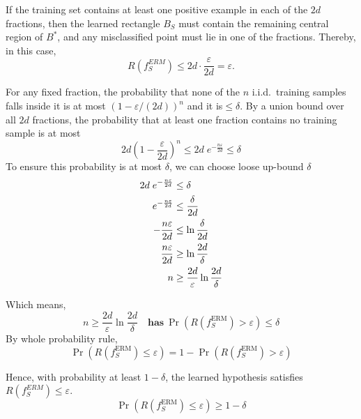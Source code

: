 \medskip
If the training set contains at least one positive example in each of the $2d$ fractions, then the learned rectangle $B_S$ must contain the remaining central region of $B^*$, and any misclassified point must lie in one of the fractions.
Thereby, in this case,
\[
R(f_S^{ERM}) \le 2d \cdot \frac{\varepsilon}{2d} = \varepsilon.
\]

For any fixed fraction, the probability that none of the $n$ i.i.d.\ training samples
falls inside it is at most $(1-\varepsilon/(2d))^n$ and it is$\le\delta$.
By a union bound over all $2d$ fractions, the probability that at least one fraction
contains no training sample is at most
\[
2d \left(1-\frac{\varepsilon}{2d}\right)^n  \le
2d \; e^{-\frac{n\varepsilon}{2d}} \le
\delta
\]
To ensure this probability is at most $\delta$, we can choose loose up-bound $\delta$
\begin{align*}
2d \; e^{-\frac{n\varepsilon}{2d}} &\le \delta \\
e^{-\frac{n\varepsilon}{2d}} &\le {\delta \over{2d}} \\
-\frac{n\varepsilon}{2d} &\le \ln{{\delta \over{2d}}}\\
\frac{n\varepsilon}{2d} &\ge  \ln{{2d \over{\delta}}}\\
n &\ge \frac{2d}{\varepsilon}\ln\frac{2d}{\delta}
\end{align*}

Which means,
\[
n \ge \frac{2d}{\varepsilon}\ln\frac{2d}{\delta} \quad  \textbf{has} \: \Pr(R(f_S^{\mathrm{ERM}}) > \varepsilon) \le \delta
\]
By whole probability rule,
\[
\Pr(R(f_S^{\mathrm{ERM}}) \le \varepsilon) = 1 - \Pr(R(f_S^{\mathrm{ERM}}) > \varepsilon)
\]

Hence, with probability at least $1-\delta$, the learned hypothesis satisfies
$R(f_S^{ERM}) \le \varepsilon$.
\[
\Pr(R(f_S^{\mathrm{ERM}}) \le \varepsilon) \ge 1- \delta 
\]

\bigskip

\bigskip